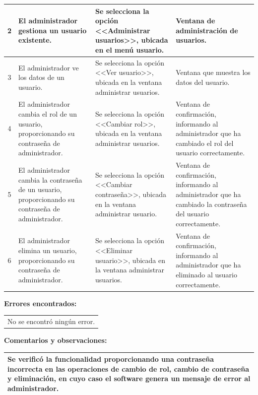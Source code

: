 {\begin{table}[h]
\begin{tabulary}{\anchotabla}{|c|J|J|J|}
			2 & El administrador gestiona un usuario existente. & Se selecciona la opci\'{o}n <<Administrar usuarios>>, ubicada en el men\'{u} usuario. & Ventana de administraci\'{o}n de usuarios.\\ \hline
			
			3 & El administrador ve los datos de un usuario. & Se selecciona la opci\'{o}n <<Ver usuario>>, ubicada en la ventana administrar usuarios. & Ventana que muestra los datos del usuario.\\ \hline
			
			4 & El administrador cambia el rol de un usuario, proporcionando su contrase\~{n}a de administrador. & Se selecciona la opci\'{o}n <<Cambiar rol>>, ubicada en la ventana administrar usuarios. & Ventana de confirmaci\'{o}n, informando al administrador que ha cambiado el rol del usuario correctamente.\\ \hline
			
			5 & El administrador cambia la contrase\~{n}a de un usuario, proporcionando su contrase\~{n}a de administrador. & Se selecciona la opci\'{o}n <<Cambiar contrase\~{n}a>>, ubicada en la ventana administrar usuario. & Ventana de confirmaci\'{o}n, informando al administrador que ha cambiado la contrase\~{n}a del usuario correctamente.\\ \hline
			
			6 & El administrador elimina un usuario, proporcionando su contrase\~{n}a de administrador. & Se selecciona la opci\'{o}n <<Eliminar usuario>>, ubicada en la ventana administrar usuarios. & Ventana de confirmaci\'{o}n, informando al administrador que ha eliminado al usuario correctamente.\\ \hline
		\end{tabulary}
\end{table}
\newpage
\textbf{Errores encontrados:}
\begin{table}[H]
	\centering
	\setlength{\extrarowheight}{\altocelda}
	\begin{tabularx}{\anchotabla}{|X|}
		\hline
		\thead{\textbf{\small{Descripci\'{o}n del error}}}
		\\ \hline
		No se encontr\'{o} ning\'{u}n error.\\ \hline
	\end{tabularx}
\end{table}

\textbf{Comentarios y observaciones:}
\begin{table}[H]
	\centering
	\setlength{\extrarowheight}{\altocelda}
	\begin{tabularx}{\anchotabla}{|X|}
		\hline
		Se verific\'{o} la funcionalidad proporcionando una contrase\~{n}a incorrecta en las operaciones de cambio de rol, cambio de contrase\~{n}a y eliminaci\'{o}n, en cuyo caso el software genera un mensaje de error al administrador.\\ \hline
	\end{tabularx}
\end{table}

}
